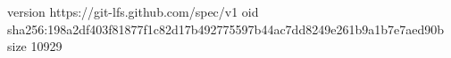 version https://git-lfs.github.com/spec/v1
oid sha256:198a2df403f81877f1c82d17b492775597b44ac7dd8249e261b9a1b7e7aed90b
size 10929
